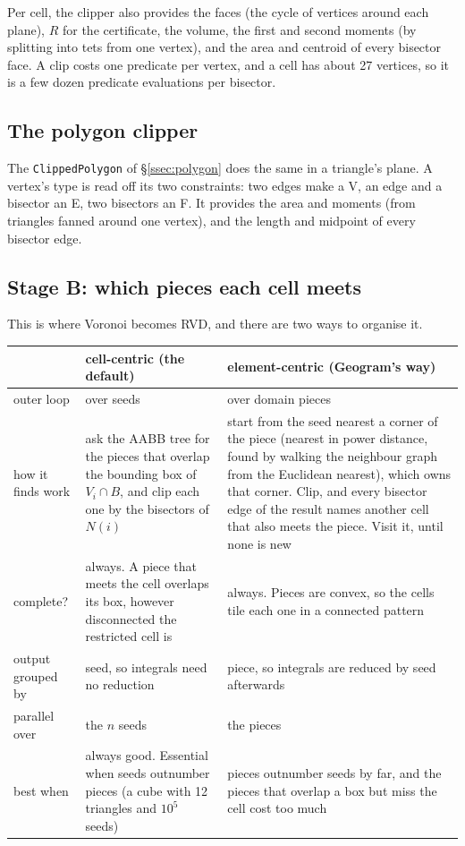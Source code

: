 \documentclass[11pt,a4paper]{article}
\newcommand{\code}[1]{\texttt{#1}}          %
\newcommand{\secref}[1]{\S\ref{#1}}
\begin{document}
Per cell, the clipper also provides the faces (the cycle of vertices around each plane), $R$ for
the certificate, the volume, the first and second moments (by splitting into tets from one
vertex), and the area and centroid of every bisector face. A clip costs one predicate per vertex,
and a cell has about 27 vertices, so it is a few dozen predicate evaluations per bisector.

\subsection{The polygon clipper}\label{ssec:clipper2d}

The \code{ClippedPolygon} of \secref{ssec:polygon} does the same in a triangle's plane. A
vertex's type is read off its two constraints: two edges make a V, an edge and a bisector an E,
two bisectors an F. It provides the area and moments (from triangles fanned around one vertex),
and the length and midpoint of every bisector edge.

\subsection{Stage B: which pieces each cell meets}\label{ssec:stageB}

This is where Voronoi becomes RVD, and there are two ways to organise it.

{\small
\begin{xltabular}{\linewidth}{@{}P{2.2cm} L L@{}}
\toprule
 & \textbf{cell-centric} (the default) & \textbf{element-centric} (Geogram's way) \\
\midrule
\endhead
outer loop & over seeds & over domain pieces \\
how it finds work
  & ask the AABB tree for the pieces that overlap the bounding box of $V_i \cap B$, and clip each
    one by the bisectors of $N(i)$
  & start from the seed nearest a corner of the piece (nearest in power distance, found by
    walking the neighbour graph from the Euclidean nearest), which owns that corner. Clip, and
    every bisector edge of the result names another cell that also meets the piece. Visit it,
    until none is new \\
complete?
  & always. A piece that meets the cell overlaps its box, however disconnected the restricted
    cell is
  & always. Pieces are convex, so the cells tile each one in a connected pattern \\
output grouped by & seed, so integrals need no reduction
  & piece, so integrals are reduced by seed afterwards \\
parallel over & the $n$ seeds & the pieces \\
best when
  & always good. Essential when seeds outnumber pieces (a cube with 12 triangles and $10^5$
    seeds)
  & pieces outnumber seeds by far, and the pieces that overlap a box but miss the cell cost too
    much \\
\bottomrule
\end{xltabular}}
\end{document}
